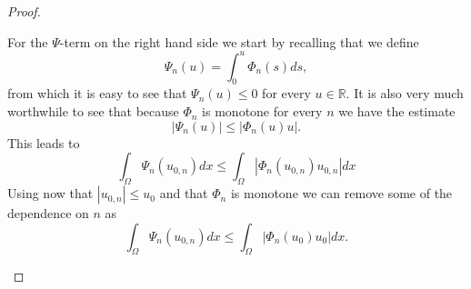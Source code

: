 \documentclass[11pt, a4paper]{article}
\begin{document}
\begin{proof}
\begin{description}
	For the $\Psi$-term on the right hand side we start by recalling that we define
	\begin{equation*}
	\Psi_n(u) = \int_0^{u}\Phi_n(s)ds,
	\end{equation*}
	from which it is easy to see that $\Psi_n(u) \leq 0$ for every $u \in \mathbb{R}$. It is also very much worthwhile to see that because $\Phi_n$ is monotone for every $n$ we have the estimate
	\begin{equation*}
	|\Psi_n(u)| \leq |\Phi_n(u)u|.
	\end{equation*}
	This leads to
	\begin{equation*}
	\int_\Omega \Psi_n(u_{0,n})dx \leq \int_\Omega |\Phi_n(u_{0,n})u_{0,n}|dx	
	\end{equation*}
	Using now that $|u_{0,n}| \leq u_0$ and that $\Phi_n$ is monotone we can remove some of the dependence on $n$ as
	\begin{equation*}
	\int_\Omega \Psi_n(u_{0,n})dx \leq \int_\Omega |\Phi_n(u_{0})u_{0}|dx.
	\end{equation*}
	

\end{description}
\end{proof}
\end{document}
